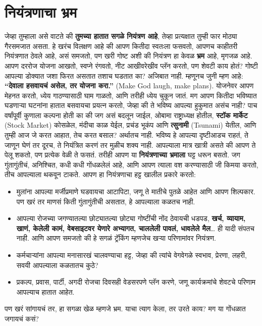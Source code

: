  \chapter{नियंत्रणाचा भ्रम}
जेव्हा तुम्हाला असे वाटते की \textbf{तुमच्या हातात सगळे नियंत्रण आहे}, तेव्हा प्रत्यक्षात तुम्ही फार मोठ्या गैरसमजात असता. हे खरंच विलक्षण आहे की आपण कितीदा स्वतःला फसवतो, आपणच काहीतरी नियंत्रणात ठेवले आहे, असं समजतो, पण खरी गोष्ट अशी की नियंत्रण हा केवळ \textbf{भ्रम} आहे, मृगजळ आहे.
आपण दररोज योजना आखतो, स्वप्ने रंगवतो, नीट आखीवरेखीव प्लॅन करतो, पण शेवटी काय होतं? गोष्टी आपल्या डोक्यात जशा फिरत असतात तशाच घडतात का? अजिबात नाही. म्हणूनच जुनी म्हण आहे: \textbf{``देवाला हसवायचं असेल, तर योजना करा.''} (Make God laugh, make plans). योजनेवर आपण मेहनत करतो, ध्येय गाठण्यासाठी घाम गाळतो, आणि तरीही ध्येय चुकून जातं. मग आपण कितीदा भविष्यात घडणाऱ्या घटनांना हातात बसवायचा प्रयत्न करतो, जेव्हा की ते भविष्य आपल्या हुकुमात असंच नाही?
पाच वर्षांपूर्वी कुणाला कल्पना होती का की जग असं बदलून जाईल, ओबामा राष्ट्राध्यक्ष होतील, \textbf{स्टॉक मार्केट} (Stock Market) कोसळेल, मंदीचा काळ येईल, प्रचंड भूकंप आणि \textbf{त्सुनामी} (Tsunami) येतील, आणि तुम्ही आज जे करत आहात, तेच करत बसाल? अर्थातच नाही. भविष्य हे आपल्या दृष्टीआडच राहतं, ते जाणून घेणं तर दूरच, ते नियंत्रित करणं तर मुळीच शक्य नाही. आपल्याला मात्र खात्री असते की आपण ते पेलू शकतो, पण प्रत्येक वेळी ते फसतं.
तरीही आपण या \textbf{नियंत्रणाच्या भ्रमाला} घट्ट धरून बसतो. जग गुंतागुंतीचं, अनिश्चित, कधी कधी गोंधळलेलं आहे, आणि आपण त्याला वश करण्यासाठी जी किमया करतो, तीच आपल्याला थकवून टाकते.
आपण हा नियंत्रणाचा हट्ट खालील प्रकारे करतो:
 \begin{itemize}
 \item मुलांना आपल्या मर्जीप्रमाणे घडवायचा आटापिटा, जणू ते मातीचे पुतळे आहेत आणि आपण शिल्पकार. पण खरं तर माणसं किती गुंतागुंतीची असतात, हे आपल्याला कळतच नाही.
 \item आपल्या रोजच्या जगण्यातल्या छोट्यातल्या छोट्या गोष्टींची नोंद ठेवायची धडपड, \textbf{खर्च, व्यायाम, खाणं, केलेली कामं, वेबसाइटवर येणारे अभ्यागत, चाललेली पावलं, धावलेले मैल}… ही यादी संपतच नाही. आणि आपण समजतो की हे सगळं ट्रॅकिंग म्हणजेच खऱ्या परिणामांवर नियंत्रण.
 \item कर्मचाऱ्यांना आपल्या मनासारखं चालवण्याचा हट्ट, जेव्हा की त्यांचे वेगवेगळे स्वभाव, प्रेरणा, लहरी, सवयी आपल्याला कळतातच कुठे?
 \item प्रकल्प, प्रवास, पार्टी, अगदी रोजचा दिवसही वेडसरपणे प्लॅन करणे, जणू कार्यक्रमांचे शेवटचे परिणाम आपल्याच हातात आहेत.
 \end{itemize}
पण खरं सांगायचं तर, हा सगळा खेळ म्हणजे भ्रम. याचा त्याग केला, तर उरते काय? मग या गोंधळात जगायचं कसं?
